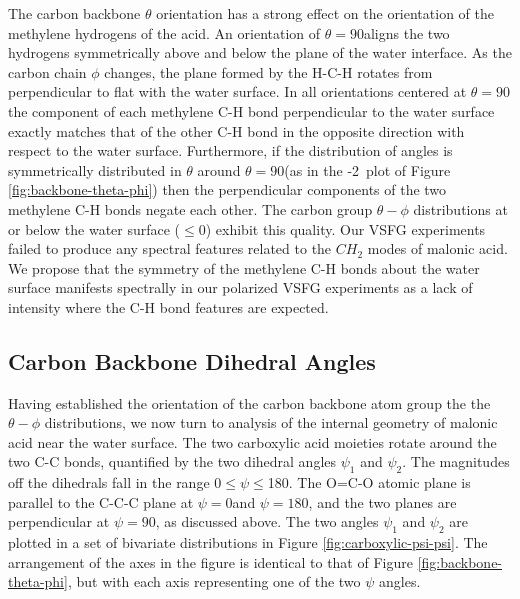 The carbon backbone $\theta$ orientation has a strong effect on the orientation of the methylene hydrogens of the acid. An orientation of $\theta=90$\textdegree aligns the two hydrogens symmetrically above and below the plane of the water interface. As the carbon chain $\phi$ changes, the plane formed by the H-C-H rotates from perpendicular to flat with the water surface. In all orientations centered at $\theta=90$\textdegree the component of each methylene C-H bond perpendicular to the water surface exactly matches that of the other C-H bond in the opposite direction with respect to the water surface. Furthermore, if the distribution of angles is symmetrically distributed in $\theta$ around $\theta=90$\textdegree (as in the -2\angs~plot of Figure \ref{fig:backbone-theta-phi}) then the perpendicular components of the two methylene C-H bonds negate each other. The carbon group $\theta-\phi$ distributions at or below the water surface ($\le 0$\angs) exhibit this quality. Our VSFG experiments failed to produce any spectral features related to the $CH_2$ modes of malonic acid. We propose that the symmetry of the methylene C-H bonds about the water surface manifests spectrally in our polarized VSFG experiments as a lack of intensity where the C-H bond features are expected. 

\subsection {Carbon Backbone Dihedral Angles}

Having established the orientation of the carbon backbone atom group the the $\theta-\phi$ distributions, we now turn to analysis of the  internal geometry of malonic acid near the water surface. The two carboxylic acid moieties rotate around the two C-C bonds, quantified by the two dihedral angles $\psi_1$ and $\psi_2$. The magnitudes off the dihedrals fall in the range 0\textdegree$\le \psi \le$180\textdegree. The O=C-O atomic plane is parallel to the C-C-C plane at $\psi=0$\textdegree and $\psi=180$\textdegree, and the two planes are perpendicular at $\psi=90$\textdegree, as discussed above. The two angles $\psi_1$ and $\psi_2$ are plotted in a set of bivariate distributions in Figure \ref{fig:carboxylic-psi-psi}. The arrangement of the axes in the figure is identical to that of Figure \ref{fig:backbone-theta-phi}, but with each axis representing one of the two $\psi$ angles.

